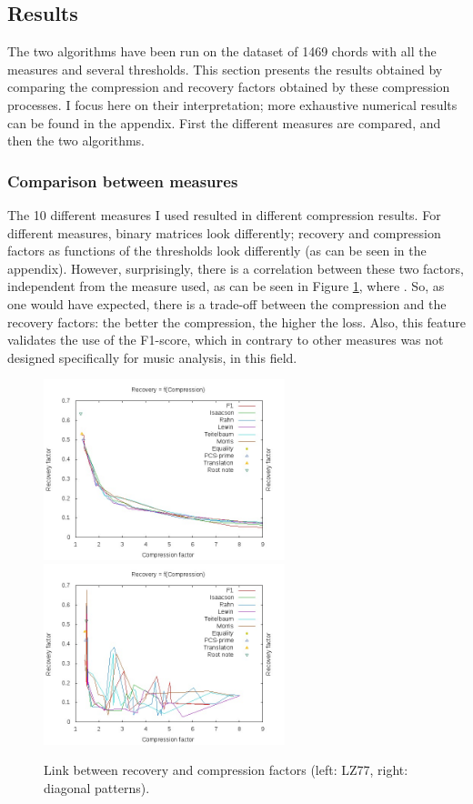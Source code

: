 \documentclass[a4paper,10pt]{article}
\begin{document}
\subsection{Results}

The two algorithms have been run on the dataset of 1469 chords with all the measures and several thresholds. 
This section presents the results obtained by comparing the compression and recovery factors obtained by these compression processes. I focus here on their interpretation; more exhaustive numerical results can be found in the appendix. First the different measures are compared, and then the two algorithms.

\subsubsection*{Comparison between measures}

\label{resultsmeasures}
The 10 different measures I used resulted in different compression results. For different measures, binary matrices look differently; recovery and compression factors as functions of the thresholds look differently (as can be seen in the appendix). However, surprisingly, there is a correlation between these two factors, independent from the measure used, as can be seen in Figure \ref{rfc}, where . So, as one would have expected, there is a trade-off between the compression and the recovery factors: the better the compression, the higher the loss. Also, this feature validates the use of the F1-score, which in contrary to other measures was not designed specifically for music analysis, in this field.

\begin{figure}[h]
\centering
\includegraphics[width=7cm]{images/RfC77.jpg}\hspace{0.5cm}
\includegraphics[width=7cm]{images/RfCDiag.jpg}
\caption{Link between recovery and compression factors (left: LZ77, right: diagonal patterns).\label{rfc}}
\end{figure}
\end{document}
